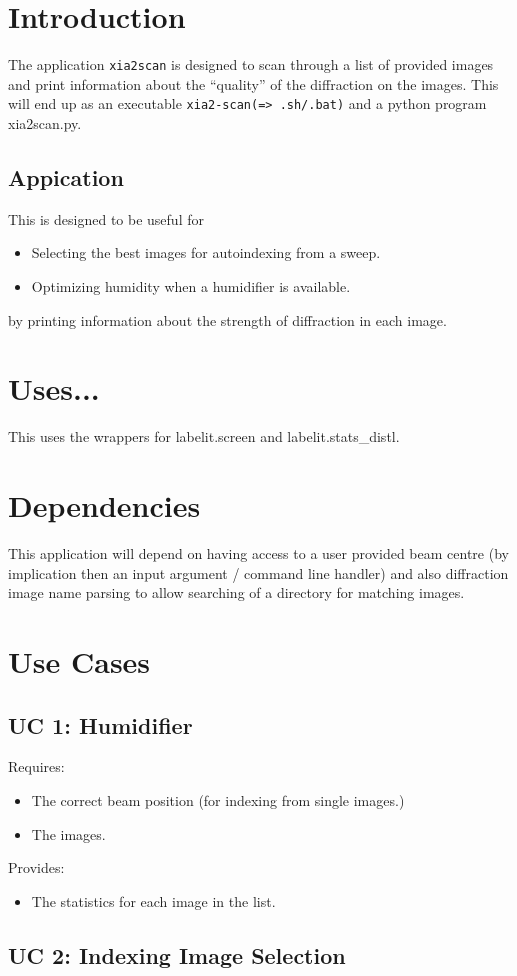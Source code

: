 \documentclass[a4paper, 11pt]{article}
\begin{document}
\section{Introduction}

The application \verb|xia2scan| is designed to scan through a list of 
provided images and print information about the ``quality'' of the 
diffraction on the images. This will end up as an executable
\verb|xia2-scan(=> .sh/.bat)| and a python program xia2scan.py.

\subsection{Appication}

This is designed to be useful for 

\begin{itemize}
\item{Selecting the best images for autoindexing from a sweep.}
\item{Optimizing humidity when a humidifier is available.}
\end{itemize}

\noindent
by printing information about the strength of diffraction in each image.

\section{Uses...}

This uses the wrappers for labelit.screen and labelit.stats\_distl.

\section{Dependencies}

This application will depend on having access to a user provided beam centre
(by implication then an input argument / command line handler) and also 
diffraction image name parsing to allow searching of a directory for
matching images.

\section{Use Cases}

\subsection{UC 1: Humidifier}

Requires:

\begin{itemize}
\item{The correct beam position (for indexing from single images.)}
\item{The images.}
\end{itemize}

Provides:

\begin{itemize}
\item{The statistics for each image in the list.}
\end{itemize}

\subsection{UC 2: Indexing Image Selection}
\end{document}
